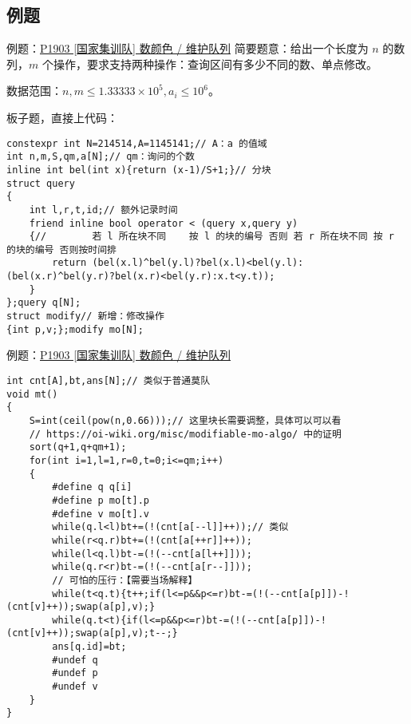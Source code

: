 \documentclass[table]{beamer}
\begin{document}
\subsection{例题}
\begin{frame}[fragile]
{例题：{\color{blue}\href{https://www.luogu.com.cn/problem/P1903}{P1903 [国家集训队] 数颜色 / 维护队列}}}
	简要题意：给出一个长度为 $n$ 的数列，$m$ 个操作，要求支持两种操作：查询区间有多少不同的数、单点修改。

	数据范围：$n,m\le 1.33333\times 10^5,a_i\le 10^6$。
	\pause

	板子题，直接上代码：\tiny
\begin{verbatim}
constexpr int N=214514,A=1145141;// A：a 的值域
int n,m,S,qm,a[N];// qm：询问的个数
inline int bel(int x){return (x-1)/S+1;}// 分块
struct query
{
    int l,r,t,id;// 额外记录时间
    friend inline bool operator < (query x,query y)
    {//        若 l 所在块不同    按 l 的块的编号 否则 若 r 所在块不同 按 r 的块的编号 否则按时间排
        return (bel(x.l)^bel(y.l)?bel(x.l)<bel(y.l):(bel(x.r)^bel(y.r)?bel(x.r)<bel(y.r):x.t<y.t));
    }
};query q[N];
struct modify// 新增：修改操作
{int p,v;};modify mo[N];
\end{verbatim}
\end{frame}
\begin{frame}[fragile]
{例题：{\color{blue}\href{https://www.luogu.com.cn/problem/P1903}{P1903 [国家集训队] 数颜色 / 维护队列}}}
\tiny
\begin{verbatim}
int cnt[A],bt,ans[N];// 类似于普通莫队
void mt()
{
    S=int(ceil(pow(n,0.66)));// 这里块长需要调整，具体可以可以看
    // https://oi-wiki.org/misc/modifiable-mo-algo/ 中的证明
    sort(q+1,q+qm+1);
    for(int i=1,l=1,r=0,t=0;i<=qm;i++)
    {
        #define q q[i]
        #define p mo[t].p
        #define v mo[t].v
        while(q.l<l)bt+=(!(cnt[a[--l]]++));// 类似
        while(r<q.r)bt+=(!(cnt[a[++r]]++));
        while(l<q.l)bt-=(!(--cnt[a[l++]]));
        while(q.r<r)bt-=(!(--cnt[a[r--]]));
        // 可怕的压行：【需要当场解释】
        while(t<q.t){t++;if(l<=p&&p<=r)bt-=(!(--cnt[a[p]])-!(cnt[v]++));swap(a[p],v);}
        while(q.t<t){if(l<=p&&p<=r)bt-=(!(--cnt[a[p]])-!(cnt[v]++));swap(a[p],v);t--;}
        ans[q.id]=bt;
        #undef q
        #undef p
        #undef v
    }
}
\end{verbatim}
\end{frame}
\end{document}
